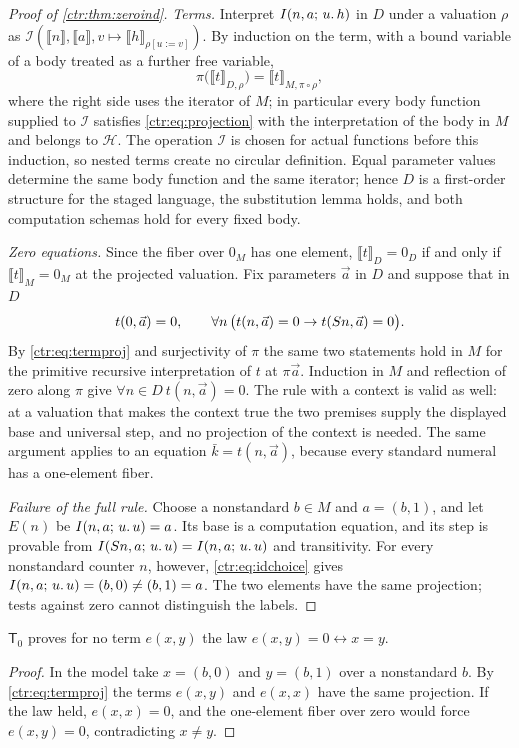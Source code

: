 \begin{proof}[Proof of \cref{ctr:thm:zeroind}]
\emph{Terms.} Interpret
$I(n,a;\,u.\,h)$ in $D$ under a valuation $\rho$ as
$\mathcal I(\llbracket n\rrbracket,\llbracket a\rrbracket,v\mapsto\llbracket h\rrbracket_{\rho[u:=v]})$.
By induction on the term, with a bound variable of a body treated as a further free
variable,
\begin{equation}\label{ctr:eq:termproj}
 \pi\bigl(\llbracket t\rrbracket_{D,\rho}\bigr)=\llbracket t\rrbracket_{M,\pi\circ\rho},
\end{equation}
where the right side uses the iterator of $M$; in particular every body function supplied
to $\mathcal I$ satisfies \eqref{ctr:eq:projection} with the interpretation of the body in
$M$ and belongs to $\mathscr H$. The operation $\mathcal I$ is chosen for actual functions
before this induction, so nested terms create no circular definition. Equal parameter
values determine the same body function and the same iterator; hence $D$ is a first-order
structure for the staged language, the substitution lemma holds, and both computation
schemas hold for every fixed body.

\emph{Zero equations.} Since the fiber over $0_M$ has one element,
$\llbracket t\rrbracket_D=0_D$ if and only if $\llbracket t\rrbracket_M=0_M$ at the
projected valuation. Fix parameters $\vec a$ in $D$ and suppose that in $D$
\[
 t(0,\vec a)=0,\qquad \forall n\,\bigl(t(n,\vec a)=0\to t(S n,\vec a)=0\bigr).
\]
By \eqref{ctr:eq:termproj} and surjectivity of $\pi$ the same two statements hold in $M$
for the primitive recursive interpretation of $t$ at $\pi\vec a$. Induction in $M$ and
reflection of zero along $\pi$ give $\forall n\in D\ t(n,\vec a)=0$. The rule with a context
is valid as well: at a valuation that makes the context true the two premises supply the
displayed base and universal step, and no projection of the context is needed. The same
argument applies to an equation $\bar k=t(n,\vec a)$, because every standard numeral has a
one-element fiber.

\emph{Failure of the full rule.} Choose a nonstandard $b\in M$ and $a=(b,1)$, and let
$E(n)$ be $I(n,a;\,u.\,u)=a$. Its base is a computation equation, and its step is provable
from $I(S n,a;\,u.\,u)=I(n,a;\,u.\,u)$ and transitivity. For every nonstandard counter
$n$, however, \eqref{ctr:eq:idchoice} gives
$I(n,a;\,u.\,u)=(b,0)\neq(b,1)=a$. The two elements have the same projection; tests
against zero cannot distinguish the labels.
\end{proof}

\begin{corollary}\label{ctr:cor:noreflection}
$\mathsf T_0$ proves for no term $e(x,y)$ the law
$e(x,y)=0\leftrightarrow x=y$.
\end{corollary}
\begin{proof}
In the model take $x=(b,0)$ and $y=(b,1)$ over a nonstandard $b$. By
\eqref{ctr:eq:termproj} the terms $e(x,y)$ and $e(x,x)$ have the same projection. If the law
held, $e(x,x)=0$, and the one-element fiber over zero would force $e(x,y)=0$, contradicting
$x\neq y$.
\end{proof}

